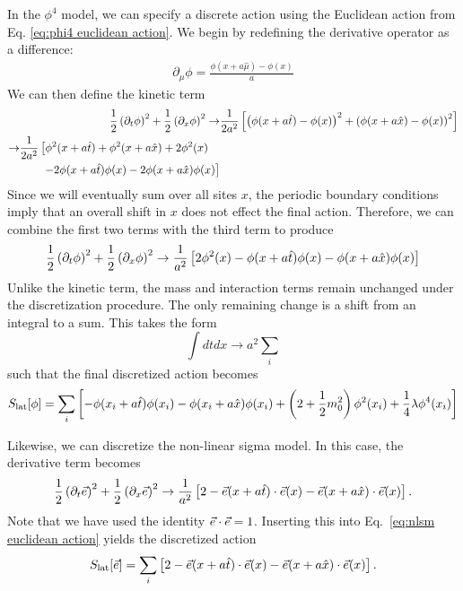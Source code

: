 In the $\phi^4$ model, we can specify a discrete action using the Euclidean action from Eq. \ref{eq:phi4 euclidean action}. We begin by redefining the derivative operator as a difference:
\begin{align}
    \partial_\mu \phi = \frac{\phi\left(x + a \hat{\mu}\right) - \phi(x)}{a}
\end{align}
We can then define the kinetic term
\begin{align}
    \half \left(\partial_t\phi\right)^2 + \half \left(\partial_x\phi\right)^2 \rightarrow& \frac{1}{2a^2}\left[ \left(\phi(x+a \hat{t}) -\phi(x)\right)^2 + \left(\phi(x+a \hat{x}) -\phi(x)\right)^2\right] \\
    \begin{split} \rightarrow& \frac{1}{2a^2}\left[ \phi^2(x+a\hat{t}) + \phi^2(x+a\hat{x}) + 2\phi^2(x)\right.\\ &\qquad \left.- 2\phi(x+a\hat{t})\phi(x) - 2\phi(x+a\hat{x})\phi(x) \right]\hfilneg\end{split}
\end{align}
Since we will eventually sum over all sites $x$, the periodic boundary conditions imply that an overall shift in $x$ does not effect the final action. Therefore, we can combine the first two terms with the third term to produce 
\begin{equation}
    \frac{1}{2} \left(\partial_t\phi\right)^2 + \frac{1}{2} \left(\partial_x\phi\right)^2 \rightarrow \frac{1}{a^2}\left[ 2\phi^2(x) - \phi(x+a\hat{t})\phi(x) - \phi(x+a\hat{x})\phi(x) \right]
\end{equation}
Unlike the kinetic term, the mass and interaction terms remain unchanged under the discretization procedure. The only remaining change is a shift from an integral to a sum. This takes the form
\begin{equation}
    \int dtdx \rightarrow a^2 \sum_i
\end{equation}
such that the final discretized action becomes
\begin{equation}
    \label{eq:phi4 discretized action}
    S_{\mathrm{lat}}[\phi] = \sum_i \left[-\phi(x_i + a\hat{t})\phi(x_i) - \phi(x_i + a\hat{x})\phi(x_i) + \left(2+\frac{1}{2} m_0^2\right)\phi^2(x_i) + \frac{1}{4}\lambda \phi^4(x_i)\right]
\end{equation}

Likewise, we can discretize the non-linear sigma model. In this case, the derivative term becomes 
\begin{equation}
    \frac{1}{2} \left(\partial_t\vec e\right)^2 + \frac{1}{2} \left(\partial_x\vec e\right)^2 \rightarrow \frac{1}{a^2}\left[ 2 - \vec e(x+a\hat{t})\cdot\vec e(x) - \vec e(x+a\hat{x})\cdot\vec e(x) \right].
\end{equation}
Note that we have used the identity $\vec e\cdot\vec e = 1$. Inserting this into Eq.~\ref{eq:nlsm euclidean action} yields the discretized action
\begin{equation}
    \label{eq:nlsm discretized action}
    S_\mathrm{lat}[\vec e] = \sum_i \left[ 2 - \vec e(x+a\hat{t})\cdot\vec e(x) - \vec e(x+a\hat{x})\cdot\vec e(x) \right].
\end{equation}

